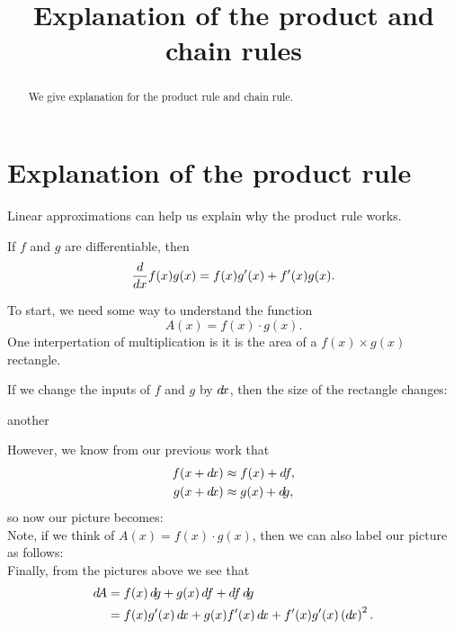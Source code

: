 \documentclass{ximera}
\title[Dig-In:]{Explanation of the product and chain rules}
\begin{document}
\begin{abstract}
  We give explanation for the product rule and chain rule.
\end{abstract}
\maketitle


\section{Explanation of the product rule}

Linear approximations can help us explain why the product rule works.

\begin{theorem}
If $f$ and $g$ are differentiable, then
\[
\frac{d}{dx} f(x)g(x) = f(x)g'(x)+f'(x)g(x).
\]
\begin{explanation}
  To start, we need some way to understand the function
  \[
  A(x) = f(x) \cdot g(x).
  \]
  One interpertation of multiplication is it is the area of a $f(x)
  \times g(x)$ rectangle.
  \begin{image}
  \end{image}
  If we change the inputs of $f$ and $g$ by $\mathop{}\!d\! x$, then the size of
  the rectangle changes:
  \begin{image}
    another
  \end{image}
  However, we know from our previous work that
  \begin{align*}
    f(x+\d x) &\approx f(x) + \d f,\\
    g(x+\d x) &\approx g(x) + \d g,\\
  \end{align*}
  so now our picture becomes:
  \[

  \]
  Note, if we think of $A(x) = f(x)\cdot g(x)$, then we can also label
  our picture as follows:
  \[

  \]
  Finally, from the pictures above we see that
  \begin{align*}
    \d A &= f(x) \d g + g(x) \d f + \d f \d g\\
    &=f(x) g'(x) \d x + g(x) f'(x) \d x + f'(x) g'(x) \left(\d x\right)^2.
  \end{align*}
\end{explanation}
\end{theorem}    
\end{document}
